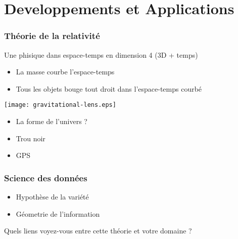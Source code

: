 \documentclass{beamer}
\begin{document}
\section{Developpements et Applications}
\begin{frame}
  \frametitle{Théorie de la relativité}
    Une phisique dans espace-temps en dimension 4 (3D + temps)
  \begin{itemize}
    \item La masse courbe l'espace-temps 
    \item Tous les objets bouge tout droit dans l'espace-temps courbé
  \end{itemize}
  \centering
  \texttt{[image: gravitational-lens.eps]}
  \begin{itemize}
    \item La forme de l'univers ?
    \item Trou noir
    \item GPS
  \end{itemize}
\end{frame}

\begin{frame}
  \frametitle{Science des données}
  \begin{itemize}
    \item Hypothèse de la variété
    \item Géometrie de l'information
  \end{itemize}
\end{frame}

\begin{frame}
  Quels liens voyez-vous entre cette théorie et votre domaine ? 
\end{frame}
\end{document}
